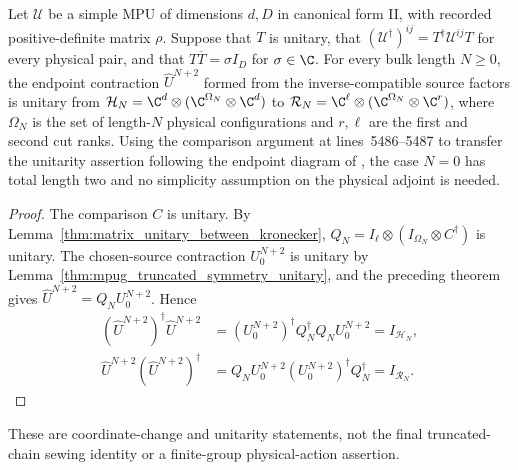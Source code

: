 \begin{lemma}
    \label{thm:mpug_inverse_truncation_unitary}
    \leanok
    Let $\mathcal U$ be a simple MPU of dimensions $d,D$ in canonical
    form II, with recorded positive-definite matrix $\rho$. Suppose that
    $T$ is unitary, that $(\mathcal U^\dagger)^{ij}=T^\dagger\mathcal U^{ij}T$
    for every physical pair, and that $T\overline T=\sigma I_D$ for
    $\sigma\in\C$. For every bulk length $N\geq0$, the endpoint
    contraction $\widehat U^{N+2}$ formed from the inverse-compatible
    source factors is unitary from
    $\mathcal H_N=\C^d\otimes(\C^{\Omega_N}\otimes\C^d)$ to
    $\mathcal R_N=\C^\ell\otimes(\C^{\Omega_N}\otimes\C^r)$, where
    $\Omega_N$ is the set of length-$N$ physical configurations and
    $r,\ell$ are the first and second cut ranks. Using the comparison
    argument at lines~5486--5487 to transfer the unitarity assertion
    following the endpoint diagram of
    \cite[lines~2062--2099]{FrancoRubio2025MPUGauging}, the case $N=0$ has
    total length two and no simplicity assumption on the physical adjoint
    is needed.
\end{lemma}
\begin{proof}\leanok
    The comparison $C$ is unitary. By
    Lemma~\ref{thm:matrix_unitary_between_kronecker},
    $Q_N=I_\ell\otimes(I_{\Omega_N}\otimes C^\dagger)$ is unitary.
    The chosen-source contraction $U_0^{N+2}$ is unitary by
    Lemma~\ref{thm:mpug_truncated_symmetry_unitary}, and the preceding
    theorem gives $\widehat U^{N+2}=Q_NU_0^{N+2}$. Hence
    \begin{align}
        (\widehat U^{N+2})^\dagger\widehat U^{N+2}
         & =(U_0^{N+2})^\dagger Q_N^\dagger Q_NU_0^{N+2}
        =I_{\mathcal H_N},                               \\
        \widehat U^{N+2}(\widehat U^{N+2})^\dagger
         & =Q_NU_0^{N+2}(U_0^{N+2})^\dagger Q_N^\dagger
        =I_{\mathcal R_N}.
    \end{align}
\end{proof}

These are coordinate-change and unitarity statements, not the final
truncated-chain sewing identity or a finite-group physical-action assertion.

